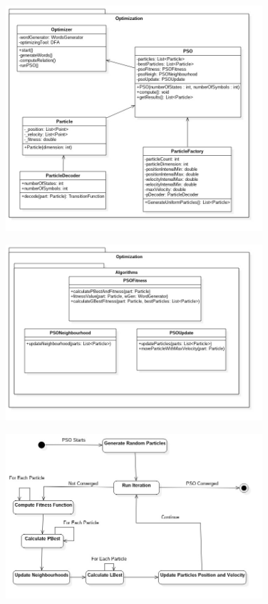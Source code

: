 \documentclass[runningheads, a4paper]{llncs}
\begin{document}
\begin{figure}[h]
    \includegraphics[width=0.85\textwidth]{res/uml/classes/optimizationMain.jpg}
\end{figure}


\begin{figure}[h]
    \includegraphics[width=0.85\textwidth]{res/uml/classes/optimizationAlg.jpg}
\end{figure}

\begin{figure}[h]
    \includegraphics[width=0.85\textwidth]{res/uml/states/optimizer.jpg}
\end{figure}
\end{document}
